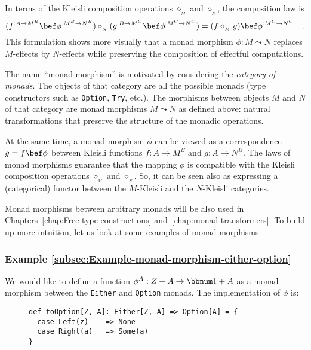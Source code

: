 In terms of the Kleisli composition operations $\diamond_{_{M}}$
and $\diamond_{_{N}}$, the composition law is
\[
(f^{:A\rightarrow M^{B}}\bef\phi^{:M^{B}\rightarrow N^{B}})\diamond_{_{N}}(g^{:B\rightarrow M^{C}}\bef\phi^{:M^{C}\rightarrow N^{C}})=(f\diamond_{_{M}}g)\bef\phi^{:M^{C}\rightarrow N^{C}}\quad.
\]
This formulation shows more visually that a monad morphism $\phi:M\leadsto N$
replaces $M$-effects by $N$-effects while preserving the composition
of effectful computations.

The name \textsf{``}monad morphism\textsf{''} is motivated by considering the \emph{category
of monads}.
The objects of that category are all the possible monads (type constructors
such as \lstinline!Option!, \lstinline!Try!, etc.). The morphisms
between objects $M$ and $N$ of that category are monad morphisms
$M\leadsto N$ as defined above: natural transformations that preserve
the structure of the monadic operations.

At the same time, a monad morphism $\phi$ can be viewed as a correspondence
$g=f\bef\phi$ between Kleisli functions $f:A\rightarrow M^{B}$ and
$g:A\rightarrow N^{B}$. The laws of monad morphisms guarantee that
the mapping $\phi$ is compatible with the Kleisli composition operations
$\diamond_{_{M}}$ and $\diamond_{_{N}}$. So, it can be seen also
as expressing a (categorical) functor between the $M$-Kleisli and
the $N$-Kleisli categories.

Monad morphisms between arbitrary monads will be also used in Chapters~\ref{chap:Free-type-constructions}
and~\ref{chap:monad-transformers}. To build up more intuition, let
us look at some examples of monad morphisms.

\subsubsection{Example \label{subsec:Example-monad-morphism-either-option}\ref{subsec:Example-monad-morphism-either-option}}

We would like to define a function $\phi^{A}:Z+A\rightarrow\bbnum 1+A$
as a monad morphism between the \lstinline!Either! and \lstinline!Option!
monads. The implementation of $\phi$ is:

\begin{wrapfigure}{l}{0.5\columnwidth}%
\vspace{-0.75\baselineskip}

\begin{lstlisting}
def toOption[Z, A]: Either[Z, A] => Option[A] = {
  case Left(z)    => None
  case Right(a)   => Some(a)
}
\end{lstlisting}
\vspace{-1.7\baselineskip}
\end{wrapfigure}%

